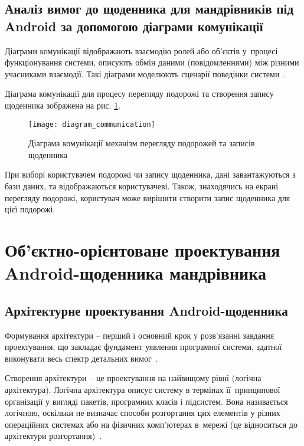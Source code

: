 \documentclass[../main.tex]{subfiles}
\begin{document}
\subsection{Аналіз вимог до щоденника для мандрівників під Android за допомогою діаграми комунікації}
Діаграми комунікації відображають взаємодію ролей або об'єктів у~процесі функціонування системи, описують обмін даними (повідомленнями) між різними учасниками взаємодії. Такі діаграми моделюють сценарії поведінки системи~\cite{diploma_guidelines}. 

Діаграма комунікації для процесу перегляду подорожі та створення запису щоденника зображена на рис. \ref{diagram:communication}.

\begin{figure}[H]
	\centering
	\texttt{[image: diagram\_communication]}
	\caption{Діаграма комунікації механізм перегляду подорожей та записів щоденника}
	\label{diagram:communication}
\end{figure}

При виборі користувачем подорожі чи запису щоденника, дані завантажуються з бази даних, та відображаються користувачеві. Також, знаходячись на екрані перегляду подорожі, користувач може вирішити створити запис щоденника для цієї подорожі.

\section{Об’єктно-орієнтоване проектування Android-щоденника мандрівника} %

\subsection{Архітектурне проектування Android-щоденника} %
Формування архітектури – перший і основний крок у розв’язанні завдання проектування, що закладає фундамент уявлення програмної системи, здатної виконувати весь спектр детальних вимог~\cite{diploma_guidelines2}.

Створення архітектури – це проектування на найвищому рівні (логічна архітектура). Логічна архітектура описує систему в термінах її~принципової організації у вигляді пакетів, програмних класів і підсистем. Вона називається логічною, оскільки не визначає способи розгортання цих елементів у різних операційних системах або на фізичних комп’ютерах в~мережі (це відноситься до архітектури розгортання)~\cite{diploma_guidelines}.
\end{document}
